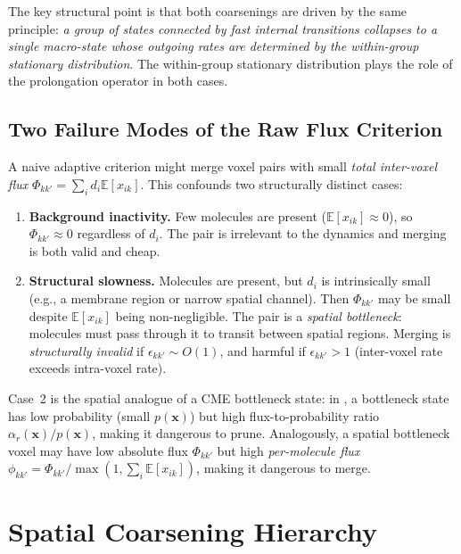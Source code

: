 \documentclass[review,onefignum,onetabnum]{siamart171218}
\newcommand{\bx}{\mathbf{x}}
\newcommand{\E}{\mathbb{E}}
\begin{document}
The key structural point is that both coarsenings are driven by
the same principle: \emph{a group of states connected by fast
internal transitions collapses to a single macro-state whose
outgoing rates are determined by the within-group stationary
distribution}.  The within-group stationary distribution plays
the role of the prolongation operator in both cases.

\subsection{Two Failure Modes of the Raw Flux Criterion}
\label{sec:failure-modes}

A naive adaptive criterion might merge voxel pairs with small
\emph{total inter-voxel flux} $\Phi_{kk'} = \sum_i d_i
\E[x_{ik}]$.  This confounds two structurally distinct cases:

\begin{enumerate}
  \item \textbf{Background inactivity.}  Few molecules are
    present ($\E[x_{ik}] \approx 0$), so $\Phi_{kk'} \approx 0$
    regardless of $d_i$.  The pair is irrelevant to the dynamics
    and merging is both valid and cheap.

  \item \textbf{Structural slowness.}  Molecules are present,
    but $d_i$ is intrinsically small (e.g., a membrane region
    or narrow spatial channel).  Then $\Phi_{kk'}$ may be small
    despite $\E[x_{ik}]$ being non-negligible.  The pair is a
    \emph{spatial bottleneck}: molecules must pass through it to
    transit between spatial regions.  Merging is
    \emph{structurally invalid} if $\epsilon_{kk'} \sim O(1)$,
    and harmful if $\epsilon_{kk'} > 1$ (inter-voxel rate
    exceeds intra-voxel rate).
\end{enumerate}

Case~2 is the spatial analogue of a CME bottleneck state: in
\cite{Dhumuntarao2024}, a bottleneck state has low probability
(small $p(\bx)$) but high flux-to-probability ratio
$\alpha_r(\bx)/p(\bx)$, making it dangerous to prune.
Analogously, a spatial bottleneck voxel may have low absolute
flux $\Phi_{kk'}$ but high \emph{per-molecule flux}
$\phi_{kk'} = \Phi_{kk'} / \max(1, \sum_i \E[x_{ik}])$,
making it dangerous to merge.

\section{Spatial Coarsening Hierarchy}
\label{sec:hierarchy}
\end{document}
